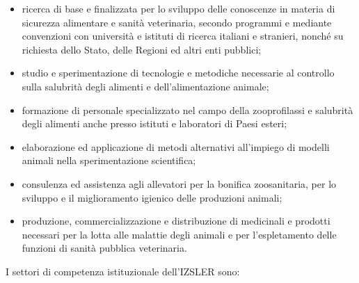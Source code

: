 \documentclass[
  12pt,
]{article}
\begin{document}
\begin{itemize}
\item
  ricerca di base e finalizzata per lo sviluppo delle conoscenze in
  materia di sicurezza alimentare e sanità veterinaria, secondo
  programmi e mediante convenzioni con università e istituti di ricerca
  italiani e stranieri, nonché su richiesta dello Stato, delle Regioni
  ed altri enti pubblici;
\item
  studio e sperimentazione di tecnologie e metodiche necessarie al
  controllo sulla salubrità degli alimenti e dell'alimentazione animale;
\item
  formazione di personale specializzato nel campo della zooprofilassi e
  salubrità degli alimenti anche presso istituti e laboratori di Paesi
  esteri;
\item
  elaborazione ed applicazione di metodi alternativi all'impiego di
  modelli animali nella sperimentazione scientifica;
\item
  consulenza ed assistenza agli allevatori per la bonifica zoosanitaria,
  per lo sviluppo e il miglioramento igienico delle produzioni animali;
\item
  produzione, commercializzazione e distribuzione di medicinali e
  prodotti necessari per la lotta alle malattie degli animali e per
  l'espletamento delle funzioni di sanità pubblica veterinaria.
\end{itemize}

I settori di competenza istituzionale dell'IZSLER sono:
\end{document}
